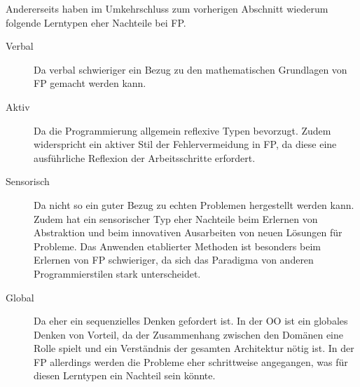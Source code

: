 Andererseits haben im Umkehrschluss zum vorherigen Abschnitt wiederum folgende Lerntypen eher Nachteile bei FP.

\begin{description}
    \item[Verbal] Da verbal schwieriger ein Bezug zu den mathematischen Grundlagen von FP gemacht werden kann.
    \item[Aktiv] Da die Programmierung allgemein reflexive Typen bevorzugt. Zudem widerspricht ein aktiver Stil der Fehlervermeidung in FP, da diese eine ausführliche Reflexion der Arbeitsschritte erfordert.
    \item[Sensorisch] Da nicht so ein guter Bezug zu echten Problemen hergestellt werden kann. Zudem hat ein sensorischer Typ eher Nachteile beim Erlernen von Abstraktion und beim innovativen Ausarbeiten von neuen Lösungen für Probleme. Das Anwenden etablierter Methoden ist besonders beim Erlernen von FP schwieriger, da sich das Paradigma von anderen Programmierstilen stark unterscheidet.
    \item[Global] Da eher ein sequenzielles Denken gefordert ist. In der OO ist ein globales Denken von Vorteil, da der Zusammenhang zwischen den Domänen eine Rolle spielt und ein Verständnis der gesamten Architektur nötig ist. In der FP allerdings werden die Probleme eher schrittweise angegangen, was für diesen Lerntypen ein Nachteil sein könnte.
\end{description}